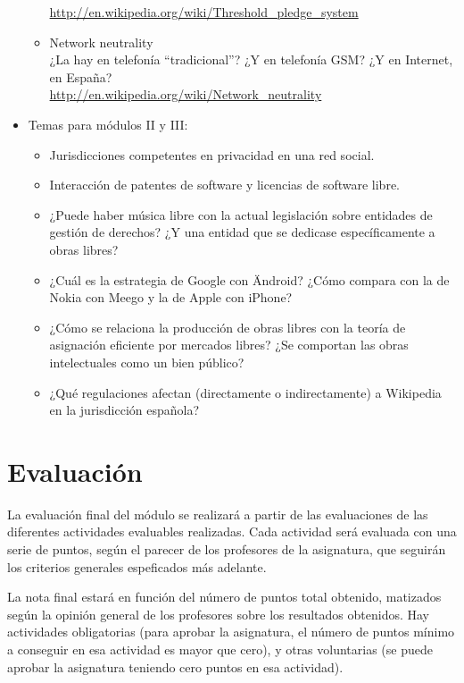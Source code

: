 \documentclass[a4paper,12pt]{article}
\begin{document}
\begin{itemize}
\begin{itemize}
    \url{http://en.wikipedia.org/wiki/Threshold_pledge_system}
  \item Network neutrality \\
    ¿La hay en telefonía ``tradicional''? ¿Y en telefonía GSM? ¿Y en Internet, en España? \\
    \url{http://en.wikipedia.org/wiki/Network_neutrality}
  \end{itemize}
\item Temas para módulos II y III:
  \begin{itemize}
  \item Jurisdicciones competentes en privacidad en una red social.
  \item Interacción de patentes de software y licencias de software libre.
  \item ¿Puede haber música libre con la actual legislación sobre entidades de gestión de derechos? ¿Y una entidad que se dedicase específicamente a obras libres?
  \item ¿Cuál es la estrategia de Google con Ändroid? ¿Cómo compara con la de Nokia con Meego y la de Apple con iPhone?
  \item ¿Cómo se relaciona la producción de obras libres con la teoría de asignación eficiente por mercados libres? ¿Se comportan las obras intelectuales como un bien público?
  \item ¿Qué regulaciones afectan (directamente o indirectamente) a Wikipedia en la jurisdicción española?
  \end{itemize}
\end{itemize}

\section{Evaluación}

La evaluación final del módulo se realizará a partir de las evaluaciones de las diferentes actividades evaluables realizadas. Cada actividad será evaluada con una serie de puntos, según el parecer de los profesores de la asignatura, que seguirán los criterios generales espeficados más adelante.

La nota final estará en función del número de puntos total obtenido, matizados según la opinión general de los profesores sobre los resultados obtenidos. Hay actividades obligatorias (para aprobar la asignatura, el número de puntos mínimo a conseguir en esa actividad es mayor que cero), y otras voluntarias (se puede aprobar la asignatura teniendo cero puntos en esa actividad).
\end{document}
